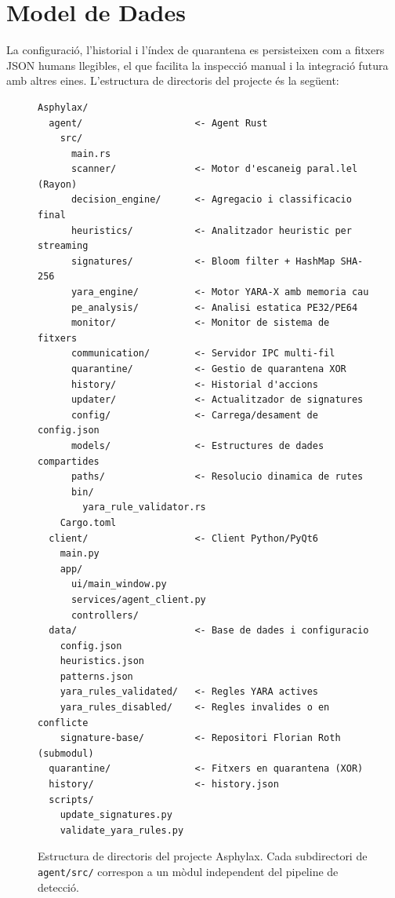 \documentclass[12pt,a4paper]{report}
\begin{document}
\section{Model de Dades}
La configuració, l'historial i l'índex de quarantena es persisteixen com a fitxers JSON humans llegibles, el que facilita la inspecció manual i la integració futura amb altres eines. L'estructura de directoris del projecte és la següent:

\begin{figure}[H]
\centering
\begin{tcolorbox}[
  enhanced,
  colback=backcolour,
  colframe=codeblue!45,
  arc=5pt, boxrule=0.8pt,
  title={\small\bfseries Estructura de directoris --- Projecte Asphylax},
  coltitle=white,
  colbacktitle=codeblue!65,
  fonttitle=\small\bfseries,
  left=6pt, right=6pt, top=4pt, bottom=4pt
]
\begin{lstlisting}[language={}, numbers=none, frame=none,
                   backgroundcolor=\color{backcolour},
                   basicstyle=\ttfamily\footnotesize]
Asphylax/
  agent/                    <- Agent Rust
    src/
      main.rs
      scanner/              <- Motor d'escaneig paral.lel (Rayon)
      decision_engine/      <- Agregacio i classificacio final
      heuristics/           <- Analitzador heuristic per streaming
      signatures/           <- Bloom filter + HashMap SHA-256
      yara_engine/          <- Motor YARA-X amb memoria cau
      pe_analysis/          <- Analisi estatica PE32/PE64
      monitor/              <- Monitor de sistema de fitxers
      communication/        <- Servidor IPC multi-fil
      quarantine/           <- Gestio de quarantena XOR
      history/              <- Historial d'accions
      updater/              <- Actualitzador de signatures
      config/               <- Carrega/desament de config.json
      models/               <- Estructures de dades compartides
      paths/                <- Resolucio dinamica de rutes
      bin/
        yara_rule_validator.rs
    Cargo.toml
  client/                   <- Client Python/PyQt6
    main.py
    app/
      ui/main_window.py
      services/agent_client.py
      controllers/
  data/                     <- Base de dades i configuracio
    config.json
    heuristics.json
    patterns.json
    yara_rules_validated/   <- Regles YARA actives
    yara_rules_disabled/    <- Regles invalides o en conflicte
    signature-base/         <- Repositori Florian Roth (submodul)
  quarantine/               <- Fitxers en quarantena (XOR)
  history/                  <- history.json
  scripts/
    update_signatures.py
    validate_yara_rules.py
\end{lstlisting}
\end{tcolorbox}
\caption{Estructura de directoris del projecte Asphylax. Cada subdirectori de \texttt{agent/src/} correspon a un mòdul independent del pipeline de detecció.}
\label{fig:estructura_directoris}
\end{figure}
\end{document}
